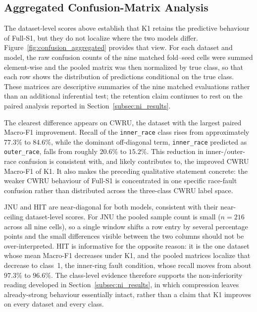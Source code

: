 \subsection{Aggregated Confusion-Matrix Analysis}
\label{subsec:confusion_analysis}



The dataset-level scores above establish that K1 retains the predictive
behaviour of Full-S1, but they do not localize where the two models differ.
Figure~\ref{fig:confusion_aggregated} provides that view. For each dataset and
model, the raw confusion counts of the nine matched fold--seed cells were summed
element-wise and the pooled matrix was then normalized by true class, so that
each row shows the distribution of predictions conditional on the true class.
These matrices are descriptive summaries of the nine matched evaluations rather
than an additional inferential test; the retention claim continues to rest on
the paired analysis reported in Section~\ref{subsec:ni_results}.

The clearest difference appears on CWRU, the dataset with the largest paired
Macro-F1 improvement. Recall of the \texttt{inner\_race} class rises from
approximately $77.3\%$ to $84.6\%$, while the dominant off-diagonal term,
\texttt{inner\_race} predicted as \texttt{outer\_race}, falls from roughly
$20.6\%$ to $15.2\%$. This reduction in inner-/outer-race confusion is
consistent with, and likely contributes to, the improved CWRU Macro-F1 of K1.
It also makes the preceding qualitative statement concrete: the weaker CWRU
behaviour of Full-S1 is concentrated in one specific race-fault confusion rather
than distributed across the three-class CWRU label space.

JNU and HIT are near-diagonal for both models, consistent with their near-ceiling
dataset-level scores. For JNU the pooled sample count is small ($n=216$ across
all nine cells), so a single window shifts a row entry by several percentage
points and the small differences visible between the two columns should not be
over-interpreted. HIT is informative for the opposite reason: it is the one
dataset whose mean Macro-F1 decreases under K1, and the pooled matrices localize
that decrease to class~1, the inner-ring fault condition, whose recall moves
from about $97.3\%$ to $96.6\%$. The class-level evidence therefore supports the
non-inferiority reading developed in Section~\ref{subsec:ni_results}, in which
compression leaves already-strong behaviour essentially intact, rather than a
claim that K1 improves on every dataset and every class.

